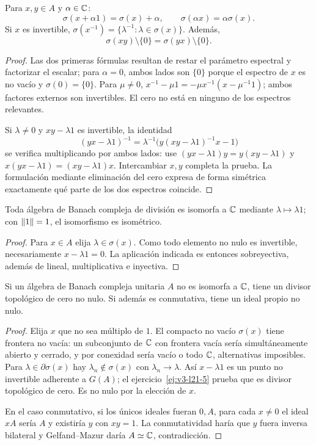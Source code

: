 \begin{proposicion}\label{v3:espectro-operaciones}
Para $x,y\in A$ y $\alpha\in\mathbb C$:
\[
 \sigma(x+\alpha1)=\sigma(x)+\alpha,\qquad
 \sigma(\alpha x)=\alpha\sigma(x).
\]
Si $x$ es invertible, $\sigma(x^{-1})=\{\lambda^{-1}:\lambda\in\sigma(x)\}$. Además,
\[
 \sigma(xy)\setminus\{0\}=\sigma(yx)\setminus\{0\}.
\]
\end{proposicion}
\begin{proof}
Las dos primeras fórmulas resultan de restar el parámetro espectral y factorizar el escalar; para $\alpha=0$, ambos lados son $\{0\}$ porque el espectro de $x$ es no vacío y $\sigma(0)=\{0\}$. Para $\mu\ne0$,
$x^{-1}-\mu1=-\mu x^{-1}(x-\mu^{-1}1)$; ambos factores externos son invertibles. El cero no está en ninguno de los espectros relevantes.

Si $\lambda\ne0$ y $xy-\lambda1$ es invertible, la identidad
\[
 (yx-\lambda1)^{-1}=\lambda^{-1}\bigl(y(xy-\lambda1)^{-1}x-1\bigr)
\]
se verifica multiplicando por ambos lados: use $(yx-\lambda1)y=y(xy-\lambda1)$ y $x(yx-\lambda1)=(xy-\lambda1)x$. Intercambiar $x,y$ completa la prueba. La formulación mediante eliminación del cero expresa de forma simétrica exactamente qué parte de los dos espectros coincide.
\end{proof}

\begin{corolario}\label{v3:gelfand-mazur}
Toda álgebra de Banach compleja de división es isomorfa a $\mathbb C$ mediante $\lambda\mapsto\lambda1$; con $\left\lVert1\right\rVert=1$, el isomorfismo es isométrico.
\end{corolario}
\begin{proof}
Para $x\in A$ elija $\lambda\in\sigma(x)$. Como todo elemento no nulo es invertible, necesariamente $x-\lambda1=0$. La aplicación indicada es entonces sobreyectiva, además de lineal, multiplicativa e inyectiva.
\end{proof}

\begin{corolario}
Si un álgebra de Banach compleja unitaria $A$ no es isomorfa a $\mathbb C$, tiene un divisor topológico de cero no nulo. Si además es conmutativa, tiene un ideal propio no nulo.
\end{corolario}
\begin{proof}
Elija $x$ que no sea múltiplo de $1$. El compacto no vacío $\sigma(x)$ tiene frontera no vacía: un subconjunto de $\mathbb C$ con frontera vacía sería simultáneamente abierto y cerrado, y por conexidad sería vacío o todo $\mathbb C$, alternativas imposibles. Para $\lambda\in\partial\sigma(x)$ hay $\lambda_n\notin\sigma(x)$ con $\lambda_n\to\lambda$. Así $x-\lambda1$ es un punto no invertible adherente a $G(A)$; el ejercicio~\ref{ej:v3-l21-5} prueba que es divisor topológico de cero. Es no nulo por la elección de $x$.

En el caso conmutativo, si los únicos ideales fueran $0,A$, para cada $x\ne0$ el ideal $xA$ sería $A$ y existiría $y$ con $xy=1$. La conmutatividad haría que $y$ fuera inversa bilateral y Gelfand--Mazur daría $A\simeq\mathbb C$, contradicción.
\end{proof}


